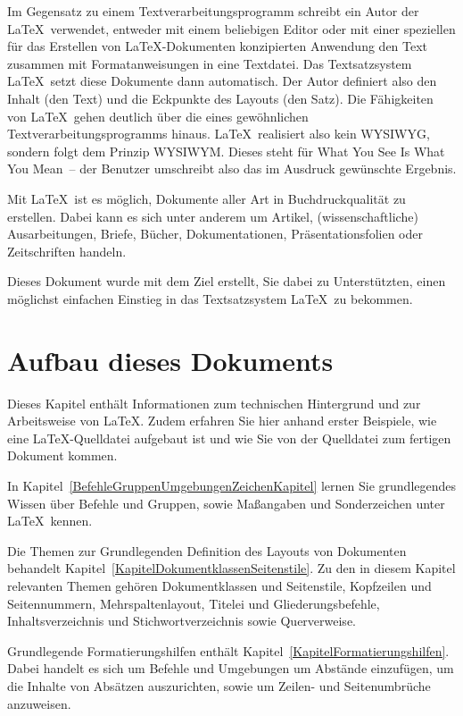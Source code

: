 \documentclass[a4paper,10pt,twoside]{scrbook}
\begin{document}
Im Gegensatz zu einem Textverarbeitungsprogramm schreibt ein Autor der \LaTeX\ verwendet, entweder mit einem beliebigen Editor oder mit einer speziellen für das Erstellen von \LaTeX-Dokumenten konzipierten Anwendung
den Text zusammen mit Formatanweisungen in eine Textdatei. 
Das Textsatzsystem \LaTeX\ setzt diese Dokumente dann automatisch. Der Autor definiert also den Inhalt (den
Text) und die Eckpunkte des Layouts (den Satz). Die Fähigkeiten 
von \LaTeX\ gehen deutlich über die eines 
gewöhnlichen Textverarbeitungsprogramms hinaus. \LaTeX\ realisiert also kein WYSIWYG, sondern folgt dem Prinzip WYSIWYM. Dieses steht für \glqq What You See Is What You Mean\grqq\ -- der Benutzer umschreibt also das im Ausdruck gewünschte Ergebnis.




Mit \LaTeX\ ist es möglich, Dokumente aller Art in Buchdruckqualität zu erstellen.
Dabei kann es sich unter anderem um Artikel, (wissenschaftliche)
Ausarbeitungen, Briefe, Bücher, Dokumentationen, Präsentationsfolien oder
Zeitschriften handeln. 


Dieses Dokument wurde mit dem Ziel erstellt, Sie dabei zu Unterstützten, einen möglichst einfachen Einstieg in das Textsatzsystem \LaTeX\ zu bekommen.




\section{Aufbau dieses Dokuments}

Dieses Kapitel enthält Informationen zum technischen Hintergrund und zur Arbeitsweise von \LaTeX. Zudem erfahren Sie hier anhand erster Beispiele, wie eine \LaTeX-Quelldatei aufgebaut ist und wie Sie von der Quelldatei zum fertigen Dokument kommen. 

In Kapitel~\ref{BefehleGruppenUmgebungenZeichenKapitel} lernen Sie grundlegendes Wissen über Befehle und Gruppen, sowie Maßangaben und Sonderzeichen unter \LaTeX\ kennen. 


Die Themen zur Grundlegenden Definition des Layouts von Dokumenten behandelt Kapitel~\ref{KapitelDokumentklassenSeitenstile}. Zu den in diesem Kapitel relevanten Themen gehören Dokumentklassen und Seitenstile, Kopfzeilen und Seitennummern, Mehrspaltenlayout, Titelei und Gliederungsbefehle, Inhaltsverzeichnis und Stichwortverzeichnis sowie Querverweise.


Grundlegende Formatierungshilfen enthält Kapitel~\ref{KapitelFormatierungshilfen}. Dabei handelt es sich um Befehle und Umgebungen um Abstände einzufügen, um die Inhalte von Absätzen auszurichten, sowie um Zeilen- und Seitenumbrüche anzuweisen.
\end{document}
